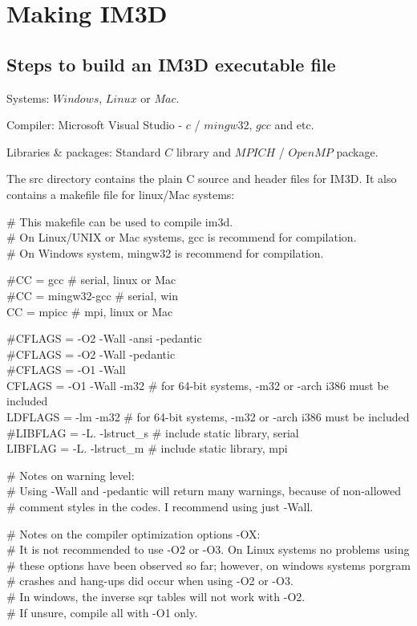 
\section{Making IM3D}

\subsection{Steps to build an IM3D executable file}

Systems:
    $Windows$, $Linux$ or $Mac$.

Compiler:
    Microsoft Visual Studio - $c$ / $mingw32$, $gcc$ and etc.

Libraries \& packages:
    Standard $C$ library and $MPICH$ / $OpenMP$ package.


The src directory contains the plain C source and header files for IM3D. It also contains a makefile file for linux/Mac systems:

\# This makefile can be used to compile im3d.\\
\# On Linux/UNIX or Mac systems, gcc is recommend for compilation.\\
\# On Windows system, mingw32 is recommend for compilation.

\#CC = gcc \# serial, linux or Mac\\
\#CC = mingw32-gcc \# serial, win\\
CC = mpicc \# mpi, linux or Mac

\#CFLAGS = -O2 -Wall -ansi -pedantic\\
\#CFLAGS = -O2 -Wall -pedantic\\
\#CFLAGS = -O1 -Wall\\
CFLAGS = -O1 -Wall -m32 \# for 64-bit systems, -m32 or -arch i386 must be included\\
LDFLAGS = -lm -m32 \# for 64-bit systems, -m32 or -arch i386 must be included\\
\#LIBFLAG = -L. -lstruct\_s \# include static library, serial\\
LIBFLAG = -L. -lstruct\_m \# include static library, mpi

\# Notes on warning level:\\
\# Using -Wall and -pedantic will return many warnings, because of non-allowed\\
\# comment styles in the codes. I recommend using just -Wall.

\# Notes on the compiler optimization options -OX:\\
\# It is not recommended to use -O2 or -O3. On Linux systems no problems using\\
\# these options have been observed so far; however, on windows systems porgram\\
\# crashes and hang-ups did occur when using -O2 or -O3.\\
\# In windows, the inverse sqr tables will not work with -O2.\\
\# If unsure, compile all with -O1 only.

